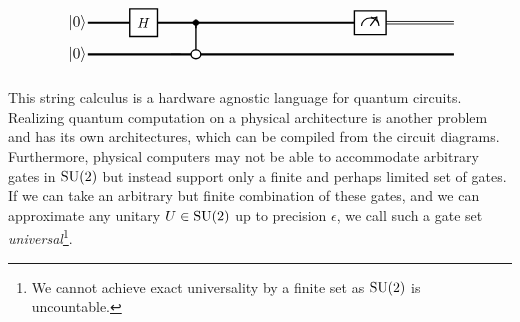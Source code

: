 \[
\begin{tikzpicture}[xscale={1.1}, scale=0.8]

  \definecolor{purple}{rgb}{0.6, 0.1, 0.6}
  \definecolor{darkgreen}{rgb}{0.1, 0.5, 0.1}
  \definecolor{darkblue}{rgb}{0.1, 0.2, 0.7}

  \draw (-2.8, 0) node { \scalebox{1.1}{$\vert 0 \rangle$} };
  \draw (-2.8, -1) node { \scalebox{1.1}{$\vert 0 \rangle$} };

  \draw[line width=1.5pt] (-2.5,-1) to (+8,-1);
  \draw[line width=1.5pt] (-2.5,0) to (+5.5,0);

  \draw[line width=.6pt] (5.5,+.04) to (8,+.04);
  \draw[line width=.6pt] (5.5,-.04) to (8,-.04);

  \node[draw, fill=white, line width=1pt, minimum width=0.7cm, minimum height=0.7cm] (Hgate) at (-0.9, 0) {$H$};

  \draw[line width=1pt] (0.6, 0) -- (0.6, -1);
  \filldraw[black] (0.6, 0) circle (2.5pt);
  \draw[line width=1pt, fill=white] (0.6, -1) circle (4pt);
  \draw[line width=1pt] (0.6-4pt, -1) -- (0.6+4pt, -1);
  \draw[line width=1pt] (0.6, -1-4pt) -- (0.6, -1+4pt);

  \node[draw, fill=white, line width=1pt, minimum width=0.8cm, minimum height=0.6cm] (MeasBox) at (5.6, 0) {};
  \draw[line width=0.8pt] (5.6-0.25, 0-0.1) arc (180:0:0.25);
  \draw[line width=0.8pt, ->] (5.6, 0-0.1) -- (5.6+0.2, 0+0.2);

\end{tikzpicture}
\]

This string calculus is a hardware agnostic language for quantum circuits.
Realizing quantum computation on a physical architecture is another problem and
has its own architectures, which can be compiled from the circuit diagrams.
Furthermore, physical computers may not be able to accommodate arbitrary gates
in $\mathrm{SU}(2)$ but instead support only a finite and perhaps limited set of gates.
If we can take an arbitrary but finite combination of these gates, and we can
approximate any unitary $U \in \mathrm{SU}(2)$  up to precision
$\epsilon$, we call such a gate set \emph{universal}\footnote{We cannot achieve
exact universality by a finite set as $\mathrm{SU}(2)$ is uncountable.}.

